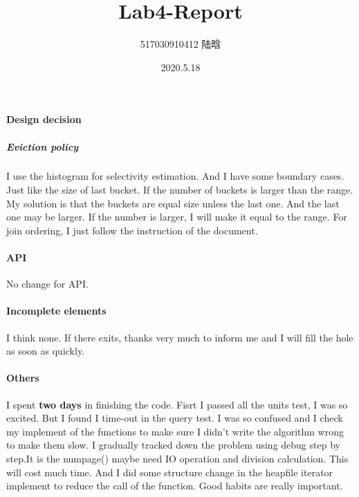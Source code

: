 \documentclass{article}
\begin{document}
\setlength{\parindent}{2em}
\title{Lab4-Report}
\author{517030910412 陆晗}
\date{2020.5.18}
\maketitle
	
\paragraph{Design decision}
\subparagraph{Eviction policy} 
I use the histogram for selectivity estimation. And I have some boundary cases. Just like the size of last bucket. If the number of buckets is larger than the range. My solution is that the buckets are equal size unless the last one. And the last one may be larger. If the number is larger, I will make it equal to the range. For join ordering, I just follow the instruction of the document. 


\paragraph{API}

No change for API.

\paragraph{Incomplete elements}

I think none. If there exits, thanks very much to inform me and I will fill the hole as soon as quickly. 

\paragraph{Others}
I spent \textbf{two days} in finishing the code. 
Fisrt I passed all the units test, I was so excited. But I found I time-out in the query test. I was so confused and I check my implement of the functions to make sure I didn't write the algorithm wrong to make them slow. I gradually tracked down the problem using debug step by step.It is the  numpage() maybe need IO operation and division calculation. This will cost much time. And I did some structure change in the heapfile iterator implement to reduce the call of the function. Good habits are really important.
\end{document}
